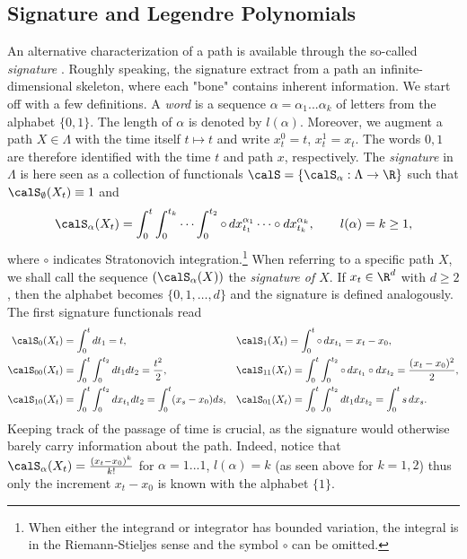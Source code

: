 
\subsection{Signature and Legendre Polynomials}\label{sec:sigLegendre}
An alternative characterization of a path is available through the so-called \textit{signature}  \cite{Lyons}.  Roughly speaking, the signature extract  from a path an infinite-dimensional skeleton, where  each "bone" contains inherent information. 
We start off with a few definitions. 
A \textit{word} is a sequence  $\alpha = \alpha_1 ... \alpha_k$ of letters from the alphabet $\{0,1\}$. The length of $\alpha$ is denoted  by $l(\alpha)$. 
Moreover, we augment a path $X \in \Lambda$ with the time itself $t \mapsto t$  and   write 
$x^0_{t} = t$, $x^1_{t} = x_t$.  The words $0,1$ are therefore identified with the time $t$ and path $x$, respectively. 
The \textit{signature} in $\Lambda$ is here seen as  a collection  of functionals $\calS= \{\calS_{\alpha}: \Lambda \to \R\}$ such that $\calS_{\emptyset}(X_t) \equiv 1$ and 
$$\calS_{\alpha}(X_t) =
\int_{0}^{t} \int_{0}^{t_k} \cdots \int_{0}^{t_2} \circ \, dx^{\alpha_1}_{t_1} \cdots \circ dx^{\alpha_k}_{t_k}, \qquad l(\alpha)=k \ge 1,$$
     where  $\circ$ indicates Stratonovich integration.\footnote{When either the integrand or  integrator has bounded variation, the integral is in the  Riemann-Stieljes sense  and the symbol $\circ$ can be omitted. \vspace{2mm}} When referring to a specific path $X$, we shall call the sequence $(\calS_{\alpha}(X))$  the \textit{signature of $X$}. If $x_t\in \R^d$ with $d\ge 2$, then the alphabet becomes $\{0,1,\ldots,d\}$ and  the signature is  defined  analogously.  
The first signature functionals read
\begin{align*}
    \calS_{0}(X_t) &= \int_0^t d t_1 = t, &&\calS_{1}(X_t) = \int_0^t \circ \,d x_{t_1} = x_t - x_0,\\
  \calS_{00}(X_t) &= \int_0^t \int_0^{t_2} d t_1 d t_2 =\frac{t^2}{2}, &&\calS_{11}(X_t) = \int_0^t \int_0^{t_2}\circ \, d x_{t_1} \circ d x_{t_2}=\frac{(x_t-x_0)^2}{2},\\
  \calS_{10}(X_t) &= \int_0^t \int_0^{t_2} dx_{t_1}  d t_2 =\int_0^t (x_{s} - x_0) ds, &&\calS_{01}(X_t) = \int_0^t \int_0^{t_2} d t_1 d x_{t_2} =\int_0^t s \,dx_s.
\end{align*}
Keeping track of the passage of time  is crucial, as the signature would otherwise barely carry  information about the path. Indeed, notice that
$\calS_{\alpha}(X_t) = \frac{(x_t-x_0)^{k}}{k!}$ for  $\alpha =  1...1$, $l(\alpha)=k$ 
(as seen above for $k=1,2$) thus only the increment $x_t-x_0$ is known with the alphabet $\{1\}$. 
 
